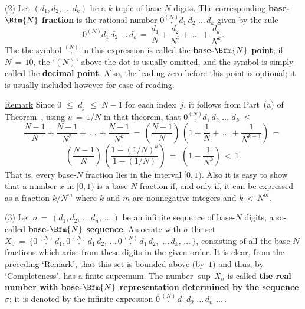 \V

        (2) Let $(d_{1}, d_{2},\,{\ldots}\,d_{k})$ be a $k$-tuple of base-$N$ digits.
    The  corresponding {\bf base-$\Bfm{N}$ fraction} is the rational number
    $0 \stackrel{(N)}{.}d_{1}\,d_{2}\,\,{\ldots}\,d_{k}$ given by the rule
        \begin{displaymath}
        0 \stackrel{(N)}{.}d_{1}\,d_{2}\,\,{\ldots}\,d_{k} \,=\, \frac{d_{1}}{N} + \frac{d_{2}}{N^{2}} + \,{\ldots}\, + \frac{d_{k}}{N^{k}}.
        \end{displaymath}
    The the symbol $\stackrel{(N)}{.}$ in this expression is called the {\bf base-$\Bfm{N}$ point};
    if $N \,=\, 10$, the `$(N)$' above the dot is usually omitted, and the symbol is simply called the {\bf decimal point}.
    Also, the leading zero before this point is optional; it is usually included however for ease of reading.

        \underline{Remark} Since $0\,\,{\leq}\,\,d_{j}\,\,{\leq}\,\,N-1$ for each index~$j$,
    it follows from Part~(a) of Theorem~, using $u \,=\, 1/N$ in that theorem,
    that $0\stackrel{(N)}{.}d_{1}\,d_{2}\,\,{\ldots}\,\,d_{k}\,\,{\leq}\,\,$
        \begin{displaymath}
        \frac{N-1}{N} + \frac{N-1}{N^{2}} + \,{\ldots}\, + \frac{N-1}{N^{k}}
     \,=\, 
        \left(\frac{N-1}{N}\right)\,\left(1 + \frac{1}{N} + \,{\ldots}\, + \frac{1}{N^{k-1}}\right)
     \,=\, 
        \end{displaymath}
        \begin{displaymath}
        \left(\frac{N-1}{N}\right)\,\left(\frac{1-(1/N)^{k}}{1-(1/N)}\right)
     \,=\, 
        \,\left(1- \frac{1}{N^{k}}\right)
    \,<\, 1.
        \end{displaymath}
    That is, every base-$N$ fraction lies in the interval $[0,1)$. Also it is easy to show that a number $x$ in $[0,1)$
    is a base-$N$ fraction if, and only if, it can be expressed as a fraction $k/N^{m}$ where $k$ and $m$ are nonnegative integers and $k\,<\,N^{m}$.

\V

        (3) Let ${\sigma} \,=\, (d_{1}, d_{2},\,{\ldots}\,d_{n},\,{\ldots}\,)$ be an infinite sequence of base-$N$ digits, a so-called {\bf base-$\Bfm{N}$ sequence}.
    Associate with ${\sigma}$ the set $X_{{\sigma}} \,=\, \{0\,\stackrel{(N)}{.}\,d_{1}, 0\,\stackrel{(N)}{.}\,d_{1}\,d_{2},\,{\ldots}\, 0\,\stackrel{(N)}{.}\,d_{1}\,d_{2},\,\,{\ldots}\,d_{k},\,{\ldots}\,\}$, 
    consisting of all the base-$N$ fractions which arise from these digits in the given order.
    It is clear, from the preceding `Remark', that this set is bounded above (by~$1$) and thus, by `Completeness', has a finite supremum.
    The number ${\sup}\,X_{{\sigma}}$
    is called {\bf the real number with base-$\Bfm{N}$ representation determined by the sequence ${\sigma}$};
    it is denoted by the infinite expression $0\,\stackrel{(N)}{.}\,d_{1}\,d_{2}\,\,{\ldots}\,d_{n}\,\,{\ldots}\,$.

